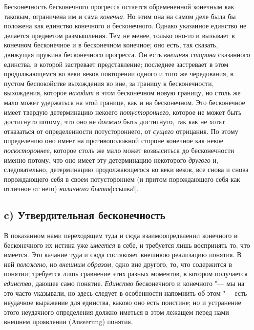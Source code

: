 Бесконечность бесконечного прогресса остается обремененной конечным как
таковым, ограничена им и сама {\em конечна}. Но этим
она на самом деле была бы положена как единство конечного и бесконечного.
Однако указанное единство не делается предметом размышления. Тем не менее,
только оно-то и вызывает в конечном бесконечное и в бесконечном конечное;
оно есть, так сказать, движущая пружина бесконечного прогресса. Он есть
{\em внешняя сторона} сказанного единства, в которой
застревает представление; последнее застревает в этом продолжающемся во
веки веков повторении одного и того же чередования, в пустом беспокойстве
выхождения во вне, за границу к бесконечности, выхождения, которое
{\em находит} в этом бесконечном новую границу, но
столь же мало может удержаться на этой границе, как и на бесконечном. Это
бесконечное имеет твердую детерминацию некоего
{\em потустороннего}, которое не может быть достигнуто
потому, что оно не {\em должно} быть достигнуто, так
как не хотят отказаться от определенности потустороннего, от
{\em сущего} отрицания. По этому определению оно имеет
на противоположной стороне конечное как некое
{\em посюстороннее}, которое столь же мало может
возвыситься до бесконечности именно потому, что оно имеет эту детерминацию
некоторого {\em другого} и, следовательно, детерминацию
продолжающегося во веки веков, все снова и снова порождающего себя в своем
потустороннем (и притом порождающего себя как отличное от него)
{\em наличного бытия}[ссылка!].

\subsection*{c) Утвердительная бесконечность}
В показанном нами переходящем туда и сюда взаимоопределении конечного и
бесконечного их истина уже {\em имеется} в себе, и
требуется лишь воспринять то, что имеется. Это качание туда и сюда
составляет внешнюю реализацию понятия. В ней
{\em положено}, но {\em внешним
образом}, одно вне другого, то, что содержится в понятии; требуется лишь
сравнение этих разных моментов, в котором получается
{\em единство}, дающее само понятие.
{\em Единство} бесконечного и конечного "--- мы на это
часто указывали, но здесь следует в особенности напомнить об этом "--- есть
неудачное выражение для единства, каково оно есть поистине; но и устранение
этого неудачного определения должно иметься в этом лежащем перед нами
внешнем проявлении (Äusserung) понятия.

